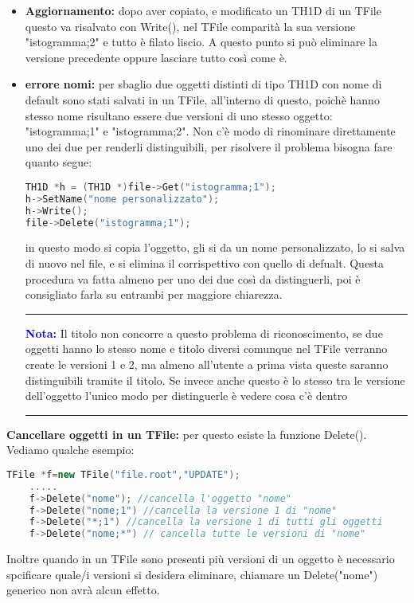\begin{itemize}
	\item \textbf{Aggiornamento:} dopo aver copiato, e modificato un TH1D di un TFile questo va risalvato con Write(), nel TFile comparità la sua versione "istogramma;2" e tutto è filato liscio. A questo punto si può eliminare la versione precedente oppure lasciare tutto così come è.
	\item  \textbf{errore nomi:} per sbaglio due oggetti distinti di tipo TH1D con nome di default sono stati salvati in un TFile, all'interno di questo, poichè hanno stesso nome risultano essere due versioni di uno stesso oggetto: "istogramma;1" e "istogramma;2". Non c'è modo di rinominare direttamente uno dei due per renderli distinguibili, per risolvere il problema bisogna fare quanto segue:
\begin{lstlisting}[language=C++,label={cod1},mathescape=true,breaklines=true]
TH1D *h = (TH1D *)file->Get("istogramma;1");
h->SetName("nome personalizzato");
h->Write();
file->Delete("istogramma;1");
\end{lstlisting}
in questo modo si copia l'oggetto, gli si da un nome personalizzato, lo si salva di nuovo nel file, e si elimina il corrispettivo con quello di defualt. Questa procedura va fatta almeno per uno dei due così da distinguerli, poi è consigliato farla su entrambi per maggiore chiarezza.\\
{\color{blue} \rule{\linewidth}{0.5mm}}
\textcolor{blue}{\textbf{Nota:}} Il titolo non concorre a questo problema di riconoscimento, se due oggetti hanno lo stesso nome e titolo diversi comunque nel TFile verranno create le versioni 1 e 2, ma almeno all'utente a prima vista queste saranno distinguibili tramite il titolo. Se invece anche questo è lo stesso tra le versione dell'oggetto l'unico modo per distinguerle è vedere cosa c'è dentro\\
{\color{blue} \rule{\linewidth}{0.5mm}}
\end{itemize}

\textbf{Cancellare oggetti in un TFile:} per questo esiste la funzione Delete(). Vediamo qualche esempio:
\begin{lstlisting}[language=C++,label={cod1},mathescape=true,breaklines=true]
	TFile *f=new TFile("file.root","UPDATE");
	.....
	f->Delete("nome"); //cancella l'oggetto "nome"
	f->Delete("nome;1") //cancella la versione 1 di "nome"
	f->Delete("*;1") //cancella la versione 1 di tutti gli oggetti
	f->Delete("nome;*") // cancella tutte le versioni di "nome"
\end{lstlisting}
Inoltre quando in un TFile sono presenti più versioni di un oggetto è necessario spcificare quale/i versioni si desidera eliminare, chiamare un Delete("nome") generico non avrà alcun effetto.
